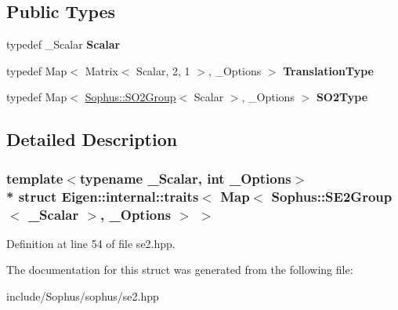 \subsection*{Public Types}
\begin{DoxyCompactItemize}
\item 
typedef \+\_\+\+Scalar {\bfseries Scalar}\hypertarget{struct_eigen_1_1internal_1_1traits_3_01_map_3_01_sophus_1_1_s_e2_group_3_01___scalar_01_4_00_01___options_01_4_01_4_a831a2d38ef48b2ecb345d43f58ce1477}{}\label{struct_eigen_1_1internal_1_1traits_3_01_map_3_01_sophus_1_1_s_e2_group_3_01___scalar_01_4_00_01___options_01_4_01_4_a831a2d38ef48b2ecb345d43f58ce1477}

\item 
typedef Map$<$ Matrix$<$ Scalar, 2, 1 $>$, \+\_\+\+Options $>$ {\bfseries Translation\+Type}\hypertarget{struct_eigen_1_1internal_1_1traits_3_01_map_3_01_sophus_1_1_s_e2_group_3_01___scalar_01_4_00_01___options_01_4_01_4_ae36348f3d5d8e9abb291d4ec09967e34}{}\label{struct_eigen_1_1internal_1_1traits_3_01_map_3_01_sophus_1_1_s_e2_group_3_01___scalar_01_4_00_01___options_01_4_01_4_ae36348f3d5d8e9abb291d4ec09967e34}

\item 
typedef Map$<$ \hyperlink{class_sophus_1_1_s_o2_group}{Sophus\+::\+S\+O2\+Group}$<$ Scalar $>$, \+\_\+\+Options $>$ {\bfseries S\+O2\+Type}\hypertarget{struct_eigen_1_1internal_1_1traits_3_01_map_3_01_sophus_1_1_s_e2_group_3_01___scalar_01_4_00_01___options_01_4_01_4_ae915b7930e5ea24556663518837d9a5c}{}\label{struct_eigen_1_1internal_1_1traits_3_01_map_3_01_sophus_1_1_s_e2_group_3_01___scalar_01_4_00_01___options_01_4_01_4_ae915b7930e5ea24556663518837d9a5c}

\end{DoxyCompactItemize}


\subsection{Detailed Description}
\subsubsection*{template$<$typename \+\_\+\+Scalar, int \+\_\+\+Options$>$\\*
struct Eigen\+::internal\+::traits$<$ Map$<$ Sophus\+::\+S\+E2\+Group$<$ \+\_\+\+Scalar $>$, \+\_\+\+Options $>$ $>$}



Definition at line 54 of file se2.\+hpp.



The documentation for this struct was generated from the following file\+:\begin{DoxyCompactItemize}
\item 
include/\+Sophus/sophus/se2.\+hpp\end{DoxyCompactItemize}
